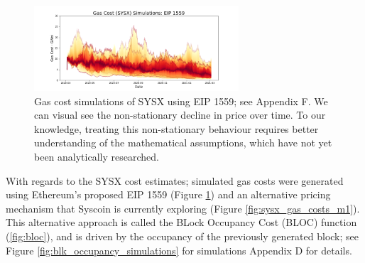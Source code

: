 \documentclass[peerreview]{ieeesyscoin}
\begin{document}
\begin{figure}[h!]
\includegraphics[width=3in]{img/sysx_gas_costs_eip_1559.png}
\caption{Gas cost simulations of SYSX using EIP 1559; see Appendix F. We can visual see the non-stationary decline in price over time. To our knowledge, treating this non-stationary behaviour requires better understanding of the mathematical assumptions, which have not yet been analytically researched.} 
\label{fig:sysx_gas_costs_eip_1559}
\end{figure} 

With regards to the SYSX cost estimates; simulated gas costs were generated using Ethereum's proposed EIP 1559 (Figure \ref{fig:sysx_gas_costs_eip_1559}) and an alternative pricing mechanism that Syscoin is currently exploring (Figure \ref{fig:sysx_gas_costs_m1}). This alternative approach is called the BLock Occupancy Cost (BLOC) function (\ref{fig:bloc}), and is driven by the occupancy of the previously generated block; see Figure \ref{fig:blk_occupancy_simulations} for simulations Appendix D for details.
\end{document}
